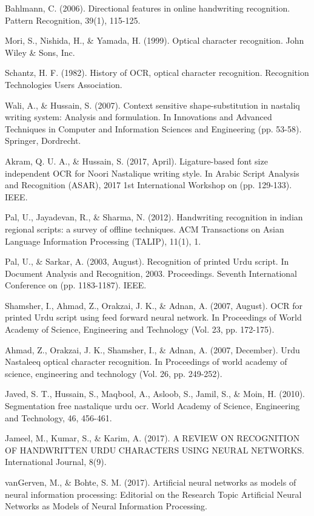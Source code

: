 \documentclass[a4paper,conference]{IEEEtran}
\begin{document}
\begin{thebibliography}{130}
Bahlmann, C. (2006). Directional features in online handwriting recognition. Pattern Recognition, 39(1), 115-125.

Mori, S., Nishida, H., \& Yamada, H. (1999). Optical character recognition. John Wiley \& Sons, Inc.

Schantz, H. F. (1982). History of OCR, optical character recognition. Recognition Technologies Users Association.

Wali, A., \& Hussain, S. (2007). Context sensitive shape-substitution in nastaliq writing system: Analysis and formulation. In Innovations and Advanced Techniques in Computer and Information Sciences and Engineering (pp. 53-58). Springer, Dordrecht.

Akram, Q. U. A., \& Hussain, S. (2017, April). Ligature-based font size independent OCR for Noori Nastalique writing style. In Arabic Script Analysis and Recognition (ASAR), 2017 1st International Workshop on (pp. 129-133). IEEE.

Pal, U., Jayadevan, R., \& Sharma, N. (2012). Handwriting recognition in indian regional scripts: a survey of offline techniques. ACM Transactions on Asian Language Information Processing (TALIP), 11(1), 1.

Pal, U., \& Sarkar, A. (2003, August). Recognition of printed Urdu script. In Document Analysis and Recognition, 2003. Proceedings. Seventh International Conference on (pp. 1183-1187). IEEE.

Shamsher, I., Ahmad, Z., Orakzai, J. K., \& Adnan, A. (2007, August). OCR for printed Urdu script using feed forward neural network. In Proceedings of World Academy of Science, Engineering and Technology (Vol. 23, pp. 172-175).

Ahmad, Z., Orakzai, J. K., Shamsher, I., \& Adnan, A. (2007, December). Urdu Nastaleeq optical character recognition. In Proceedings of world academy of science, engineering and technology (Vol. 26, pp. 249-252).

Javed, S. T., Hussain, S., Maqbool, A., Asloob, S., Jamil, S., \& Moin, H. (2010). Segmentation free nastalique urdu ocr. World Academy of Science, Engineering and Technology, 46, 456-461.

Jameel, M., Kumar, S., \& Karim, A. (2017). A REVIEW ON RECOGNITION OF HANDWRITTEN URDU CHARACTERS USING NEURAL NETWORKS. International Journal, 8(9).

vanGerven, M., \& Bohte, S. M. (2017). Artificial neural networks as models of neural information processing: Editorial on the Research Topic Artificial Neural Networks as Models of Neural Information Processing.


\end{thebibliography}
\end{document}
